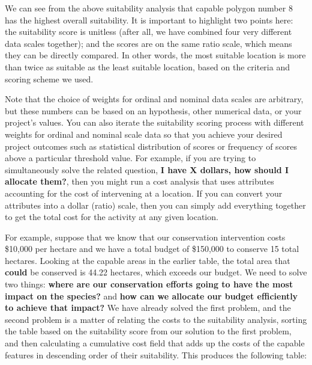 \documentclass[
]{book}
\begin{document}
We can see from the above suitability analysis that capable polygon number 8 has the highest overall suitability. It is important to highlight two points here: the suitability score is unitless (after all, we have combined four very different data scales together); and the scores are on the same ratio scale, which means they can be directly compared. In other words, the most suitable location is more than twice as suitable as the least suitable location, based on the criteria and scoring scheme we used.

Note that the choice of weights for ordinal and nominal data scales are arbitrary, but these numbers can be based on an hypothesis, other numerical data, or your project's values. You can also iterate the suitability scoring process with different weights for ordinal and nominal scale data so that you achieve your desired project outcomes such as statistical distribution of scores or frequency of scores above a particular threshold value. For example, if you are trying to simultaneously solve the related question, \textbf{I have X dollars, how should I allocate them?}, then you might run a cost analysis that uses attributes accounting for the cost of intervening at a location. If you can convert your attributes into a dollar (ratio) scale, then you can simply add everything together to get the total cost for the activity at any given location.

For example, suppose that we know that our conservation intervention costs \$10,000 per hectare and we have a total budget of \$150,000 to conserve 15 total hectares. Looking at the capable areas in the earlier table, the total area that \textbf{could} be conserved is 44.22 hectares, which exceeds our budget. We need to solve two things: \textbf{where are our conservation efforts going to have the most impact on the species?} and \textbf{how can we allocate our budget efficiently to achieve that impact?} We have already solved the first problem, and the second problem is a matter of relating the costs to the suitability analysis, sorting the table based on the suitability score from our solution to the first problem, and then calculating a cumulative cost field that adds up the costs of the capable features in descending order of their suitability. This produces the following table:
\end{document}
